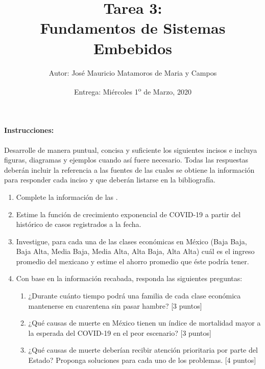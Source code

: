 \documentclass[letterpaper,10.5pt]{article}
\author{\footnotesize Autor: José Mauricio Matamoros de Maria y Campos}
\title{Tarea 3:\\
{\large Fundamentos de Sistemas Embebidos}}
\date{Entrega: Miércoles 1\textsuperscript{o} de Marzo, 2020}
\begin{document}
\maketitle
\paragraph*{Instrucciones:} Desarrolle de manera puntual, concisa y suficiente los siguientes incisos e incluya figuras, diagramas y ejemplos cuando así fuere necesario.
Todas las respuestas deberán incluir la referencia a las fuentes de las cuales se obtiene la información para responder cada inciso y que deberán listarse en la bibliografía.

\begin{enumerate}[label=\alph*)]
	\item Complete la información de las .
	\item Estime la función de crecimiento exponencial de COVID-19 a partir del histórico de casos registrados a la fecha.
	\item Investigue, para cada una de las clases económicas en México (Baja Baja, Baja Alta, Media Baja, Media Alta, Alta Baja, Alta Alta) cuál es el ingreso promedio del mexicano y estime el ahorro promedio que éste podría tener.
	\item Con base en la información recabada, responda las siguientes preguntas:
	\begin{enumerate}
		\item{} ¿Durante cuánto tiempo podrá una familia de cada clase económica mantenerse en cuarentena sin pasar hambre? [3 puntos]
		\item{} ¿Qué causas de muerte en México tienen un índice de mortalidad mayor a la esperada del COVID-19 en el peor escenario? [3 puntos]
		\item{} ¿Qué causas de muerte deberían recibir atención prioritaria por parte del Estado? Proponga soluciones para cada uno de los problemas. [4 puntos]
	\end{enumerate}

\end{enumerate}
\end{document}

